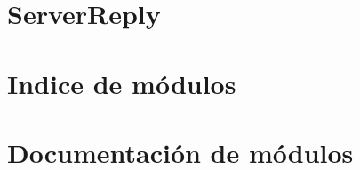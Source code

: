 \documentclass[twoside]{book}
\begin{document}
\chapter{Server\-Reply}
\label{ServerReply}
\hypertarget{ServerReply}{}

\chapter{Indice de módulos}

\chapter{Documentación de módulos}


\newpage
{}
{}
\printindex
\end{document}
